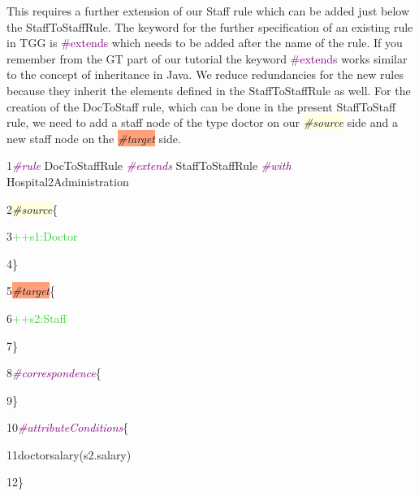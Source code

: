 This requires a further extension of our Staff rule which can be added just below the \textsf{StaffToStaffRule}. The keyword for the further specification of an existing rule in TGG is \textcolor{Purple}{\#extends} which needs to be added after the name of the rule. If you remember from the GT part of our tutorial the keyword \textcolor{Purple}{\#extends} works similar to the concept of inheritance in Java. We reduce redundancies for the new rules because they inherit the elements defined in the \textsf{StaffToStaffRule} as well.
For the creation of the DocToStaff rule, which can be done in the present StaffToStaff rule, we need to add a staff node of the type doctor on our \colorbox{LightYellow}{\textit{\#source}} side and a new staff node on the \colorbox{LightSalmon}{\textit{\#target}} side. \newline

{

1\hspace{0.5cm}\textcolor{Purple}{\textit{\#rule}} DocToStaffRule \textcolor{Purple}{\textit{\#extends}} StaffToStaffRule \textcolor{Purple}{\textit{\#with}} Hospital2Administration

2\hspace{0.5cm}\colorbox{LightYellow}{\textit{\#source}}\{

3\hspace{1cm}\textcolor{LimeGreen}{++s1:Doctor}

4\hspace{0.5cm}\}

5\hspace{0.5cm}\colorbox{LightSalmon}{\textit{\#target}}\{

6\hspace{1cm}\textcolor{LimeGreen}{++s2:Staff}

7\hspace{0.5cm}\}

8\hspace{0.5cm}\textcolor{Purple}{\textit{\#correspondence}}\{

9\hspace{0.5cm}\}

10\hspace{0.42cm}\textcolor{Purple}{\textit{\#attributeConditions}}\{

11\hspace{1cm}doctorsalary(s2.salary)

12\hspace{0.5cm}\}\newline

}

